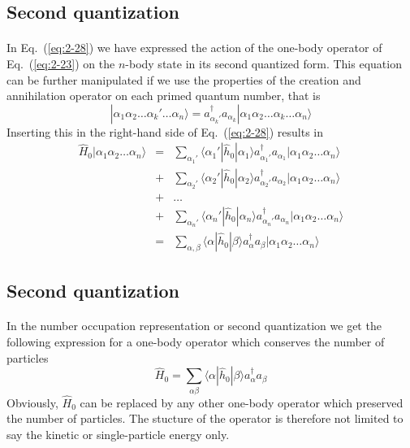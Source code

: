 \documentclass[%
twoside,                 %
final,                   %
10pt]{article}
\begin{document}
\subsection{Second quantization}

\paragraph{}
In Eq.~(\ref{eq:2-28}) 
we have expressed the action of the one-body operator
of Eq.~(\ref{eq:2-23}) on the  $n$-body state in its second quantized form.
This equation can be further manipulated if we use the properties of the creation and annihilation operator
on each primed quantum number, that is
\begin{equation}
	|\alpha_1\alpha_2 \dots \alpha_k' \dots \alpha_{n}\rangle = 
		a_{\alpha_k'}^{\dagger}  a_{\alpha_k} |\alpha_1\alpha_2 \dots \alpha_k \dots \alpha_{n}\rangle \label{eq:2-29}
\end{equation}
Inserting this in the right-hand side of Eq.~(\ref{eq:2-28}) results in
\begin{eqnarray}
	\hat{H}_0|\alpha_1\alpha_2 \dots \alpha_{n}\rangle &=& \sum_{\alpha_1'}\langle \alpha_1'|\hat{h}_0|\alpha_1\rangle
		a_{\alpha_1'}^{\dagger}  a_{\alpha_1} |\alpha_1\alpha_2 \dots \alpha_{n}\rangle \nonumber \\
	&+& \sum_{\alpha_2'} \langle \alpha_2'|\hat{h}_0|\alpha_2\rangle
		a_{\alpha_2'}^{\dagger}  a_{\alpha_2} |\alpha_1\alpha_2 \dots \alpha_{n}\rangle \nonumber \\
	&+& \dots \nonumber \\
	&+& \sum_{\alpha_n'} \langle \alpha_n'|\hat{h}_0|\alpha_n\rangle
		a_{\alpha_n'}^{\dagger}  a_{\alpha_n} |\alpha_1\alpha_2 \dots \alpha_{n}\rangle \nonumber \\
	&=& \sum_{\alpha, \beta} \langle \alpha|\hat{h}_0|\beta\rangle a_\alpha^{\dagger} a_\beta 
		|\alpha_1\alpha_2 \dots \alpha_{n}\rangle \label{eq:2-30a}
\end{eqnarray}




\subsection{Second quantization}

\paragraph{}
In the number occupation representation or second quantization we get the following expression for a one-body 
operator which conserves the number of particles
\begin{equation}
	\hat{H}_0 = \sum_{\alpha\beta} \langle \alpha|\hat{h}_0|\beta\rangle a_\alpha^{\dagger} a_\beta \label{eq:2-30b}
\end{equation}
Obviously, $\hat{H}_0$ can be replaced by any other one-body  operator which preserved the number
of particles. The stucture of the operator is therefore not limited to say the kinetic or single-particle energy only.
\end{document}
